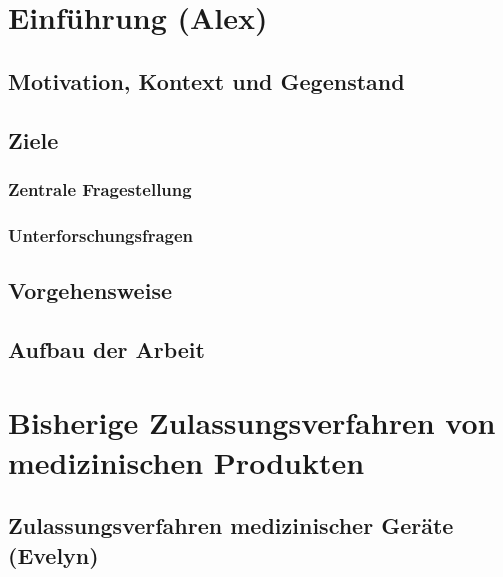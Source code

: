 \documentclass[a4paper, 11pt]{article}
\begin{document}
    \pagestyle{empty}
    
    \newpage
    
        
    \newpage
    \hypertarget{contents}{}
    \tableofcontents

    \newpage
    \pagestyle{fancy}
    \section{Einführung \small{(Alex)}}\label{sec:introduction}
        
		\subsection{Motivation, Kontext und Gegenstand}\label{sec:motivationcontext}
			
		\subsection{Ziele}\label{sec:goals}
			
			\subsubsection{Zentrale Fragestellung}\label{sec:questions}
				
			\subsubsection{Unterforschungsfragen}\label{sec:hypotheses}
				

		\subsection{Vorgehensweise}\label{sec:procedure}
			
			\subsection{Aufbau der Arbeit}\label{sec:structure}
				

	\newpage
	\section{Bisherige Zulassungsverfahren von medizinischen Produkten}\label{sec:admission}
		
		\subsection{Zulassungsverfahren medizinischer Geräte \small{(Evelyn)}}\label{sec:medproducts}
					
\end{document}
